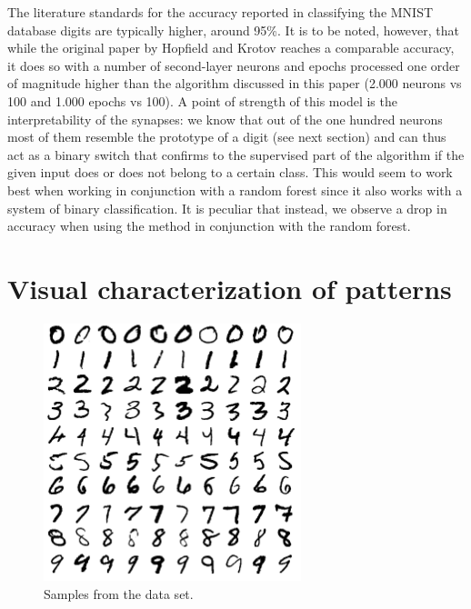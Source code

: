 \documentclass[a4paper]{report}
\begin{document}
The literature standards for the accuracy reported in classifying the MNIST database digits are typically higher, around 95\%. It is to be noted, however, that while the original paper by Hopfield and Krotov reaches a comparable accuracy, it does so with a number of second-layer neurons and epochs processed one order of magnitude higher than the algorithm discussed in this paper (2.000 neurons vs 100 and 1.000 epochs vs 100). A point of strength of this model is the interpretability of the synapses: we know that out of the one hundred neurons most of them resemble the prototype of a digit (see next section) and can thus act as a binary switch that confirms to the supervised part of the algorithm if the given input does or does not belong to a certain class. This would seem to work best when working in conjunction with a random forest since it also works with a system of binary classification. It is peculiar that instead, we observe a drop in accuracy when using the method in conjunction with the random forest.

\section{Visual characterization of patterns}

\begin{figure} [H]
\centering
\includegraphics [width=7.5cm ] {o/mnist.png}
\caption{Samples from the data set.}
\label{mnist}
\end{figure}
\end{document}
